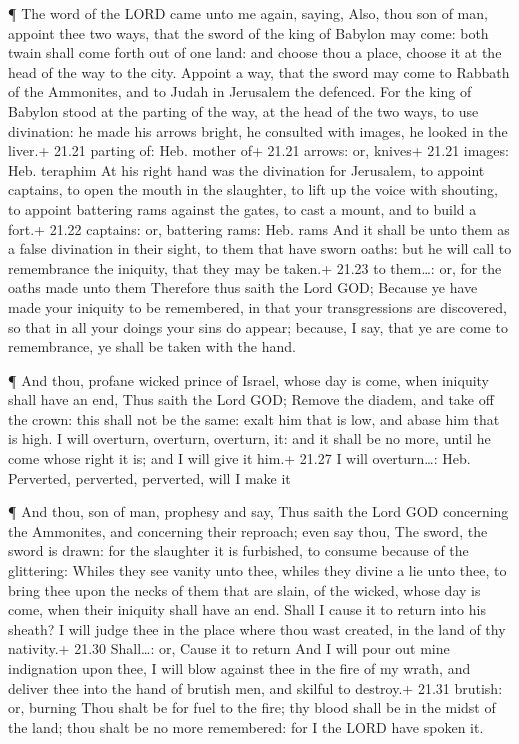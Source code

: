  ¶ The word of the LORD came unto me again, saying,
 Also, thou son of man, appoint thee two ways, that the
sword of the king of Babylon may come: both twain shall come forth out
of one land: and choose thou a place, choose it at the head of the way
to the city.  Appoint a way, that the sword may come to
Rabbath of the Ammonites, and to Judah in Jerusalem the defenced.
 For the king of Babylon stood at the parting of the way,
at the head of the two ways, to use divination: he made his arrows
bright, he consulted with images, he looked in the liver.+ 21.21 parting
of: Heb. mother of+ 21.21 arrows: or, knives+ 21.21 images: Heb.
teraphim  At his right hand was the divination for
Jerusalem, to appoint captains, to open the mouth in the slaughter, to
lift up the voice with shouting, to appoint battering rams against the
gates, to cast a mount, and to build a fort.+ 21.22 captains: or,
battering rams: Heb. rams  And it shall be unto them as a
false divination in their sight, to them that have sworn oaths: but he
will call to remembrance the iniquity, that they may be taken.+ 21.23 to
them\ldots: or, for the oaths made unto them  Therefore
thus saith the Lord GOD; Because ye have made your iniquity to be
remembered, in that your transgressions are discovered, so that in all
your doings your sins do appear; because, I say, that ye are come to
remembrance, ye shall be taken with the hand.

 ¶ And thou, profane wicked prince of Israel, whose day is
come, when iniquity shall have an end,  Thus saith the Lord
GOD; Remove the diadem, and take off the crown: this shall not be the
same: exalt him that is low, and abase him that is high.  I
will overturn, overturn, overturn, it: and it shall be no more, until he
come whose right it is; and I will give it him.+ 21.27 I will
overturn\ldots: Heb. Perverted, perverted, perverted, will I make it

 ¶ And thou, son of man, prophesy and say, Thus saith the
Lord GOD concerning the Ammonites, and concerning their reproach; even
say thou, The sword, the sword is drawn: for the slaughter it is
furbished, to consume because of the glittering:  Whiles
they see vanity unto thee, whiles they divine a lie unto thee, to bring
thee upon the necks of them that are slain, of the wicked, whose day is
come, when their iniquity shall have an end.  Shall I cause
it to return into his sheath? I will judge thee in the place where thou
wast created, in the land of thy nativity.+ 21.30 Shall\ldots: or, Cause
it to return  And I will pour out mine indignation upon
thee, I will blow against thee in the fire of my wrath, and deliver thee
into the hand of brutish men, and skilful to destroy.+ 21.31 brutish:
or, burning  Thou shalt be for fuel to the fire; thy blood
shall be in the midst of the land; thou shalt be no more remembered: for
I the LORD have spoken it.

